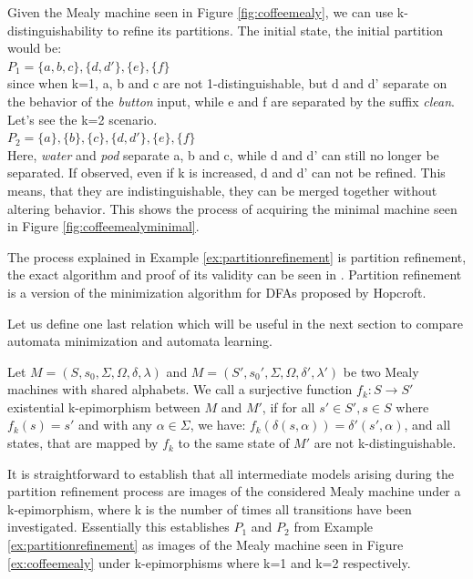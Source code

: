 \begin{example}
	Given the Mealy machine seen in Figure \ref{fig:coffeemealy}, we can use k-distinguishability to refine its partitions. The initial state, the initial partition would be:\\
	$P_1 = \{a, b, c\}, \{d, d'\}, \{e\}, \{f\}$\\
	since when k=1, a, b and c are not 1-distinguishable, but d and d' separate on the behavior of the \textit{button} input, while e and f are separated by the suffix \textit{clean}. Let's see the k=2 scenario.\\
	$P_2 = \{a\}, \{b\}, \{c\}, \{d, d'\}, \{e\}, \{f\}$\\
	Here, \textit{water} and \textit{pod} separate a, b and c, while d and d' can still no longer be separated. If observed, even if k is increased, d and d' can not be refined. This means, that they are indistinguishable, they can be merged together without altering behavior. This shows the process of acquiring the minimal machine seen in Figure \ref{fig:coffeemealyminimal}.
	\label{ex:partitionrefinement}
\end{example} 

The process explained in Example \ref{ex:partitionrefinement} is partition refinement, the exact algorithm and proof of its validity can be seen in \cite{Steffen2011}. Partition refinement is a version of the minimization algorithm for DFAs proposed by Hopcroft\cite{HOPCROFT1971189}. 

Let us define one last relation which will be useful in the next section to compare automata minimization and automata learning.

\begin{definition}[k-epimorphisms]
	Let $M=(S,s_{0},\Sigma,\Omega,\delta,\lambda)$ and $M=(S',s_{0}',\Sigma,\Omega,\delta',\lambda')$ be two Mealy machines with shared alphabets. We call a surjective function $f_k: S \to S'$ existential k-epimorphism between $M$ and $M'$, if for all $s'\in S', s\in S$ where $f_k(s) = s'$ and with any $\alpha\in\Sigma$, we have: $f_k(\delta(s,\alpha)) = \delta'(s',\alpha)$, and all states, that are mapped by $f_k$ to the same state of $M'$ are not k-distinguishable.
\end{definition}

It is straightforward to establish that all intermediate models arising during the partition refinement process are images of the considered Mealy machine under a k-epimorphism, where k is the number of times all transitions have been investigated.\cite{Steffen2011} Essentially this establishes $P_1$ and $P_2$ from Example \ref*{ex:partitionrefinement} as images of the Mealy machine seen in Figure \ref{ex:coffeemealy} under k-epimorphisms where k=1 and k=2 respectively.

